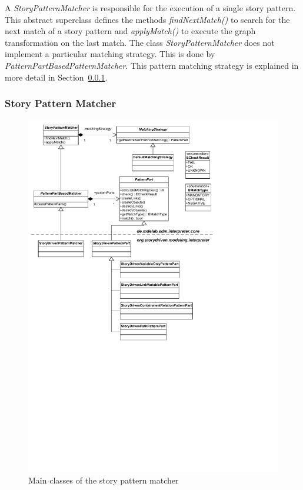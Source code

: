 A \emph{StoryPatternMatcher} is responsible for the execution of a single story pattern. 
This abstract superclass defines the methods \emph{findNextMatch()} to search for the next match of a story pattern and \emph{applyMatch()} to execute the graph transformation on the last match. 
The class \emph{StoryPatternMatcher} does not implement a particular matching strategy. 
This is done by \emph{PatternPartBasedPatternMatcher}. 
This pattern matching strategy is explained in more detail in Section~\ref{sec:story_pattern_matcher}. 


\subsubsection{Story Pattern Matcher}
\label{sec:story_pattern_matcher}

\begin{figure}[htb]
  \centering
  \includegraphics[width=1.0\columnwidth]{./figures/interpreter_storyPatternMatcher.pdf}
  \caption{Main classes of the story pattern matcher}
  \label{fig:interpreter_storyPatternMatcher}
\end{figure}

